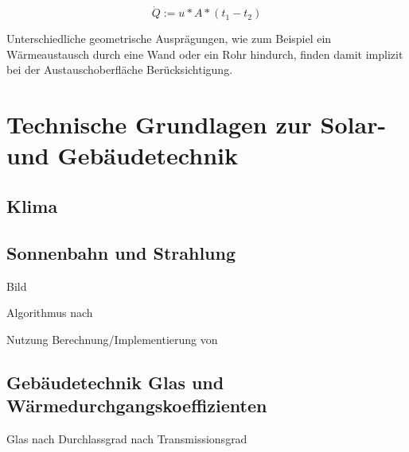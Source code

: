 \begin{equation}
\label{eq:qdot}
\dot{Q} := u*A*(t_{1}-t_{2})
\end{equation}

Unterschiedliche geometrische Ausprägungen, wie zum Beispiel ein Wärmeaustausch durch eine Wand oder ein Rohr hindurch, finden damit implizit bei der Austauschoberfläche Berücksichtigung.

\section{Technische Grundlagen zur Solar- und Gebäudetechnik}

\subsection{Klima}

\cite[S.~295ff.]{ha13}

\subsection{Sonnenbahn und Strahlung}

\cite{therakles13}
\cite[S.~63ff.]{qu11}
\cite[S.~61ff.]{ka13}
\cite[S.~315ff.]{ha13} Bild

Algorithmus nach \cite{re08}

Nutzung Berechnung/Implementierung von \cite{pysolar}

\subsection{Gebäudetechnik Glas und Wärmedurchgangskoeffizienten}

Glas nach \cite[S.~61ff.]{ha13}
Durchlassgrad nach \cite[S.~604ff.]{ha13}
Transmissionsgrad 


